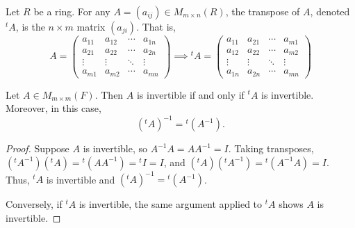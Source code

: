 \begin{definition}
  Let $R$ be a ring. For any $A = (a_{ij}) \in M_{m \times n}(R)$, the transpose of $A$, denoted ${}^t\!A$, is the $n \times m$ matrix $(a_{ji})$. That is,
  \[
    A =
    \begin{pmatrix}
      a_{11} & a_{12} & \cdots & a_{1n} \\
      a_{21} & a_{22} & \cdots & a_{2n} \\
      \vdots & \vdots & \ddots & \vdots \\
      a_{m1} & a_{m2} & \cdots & a_{mn}
    \end{pmatrix}
    \implies
    {}^t\!A =
    \begin{pmatrix}
      a_{11} & a_{21} & \cdots & a_{m1} \\
      a_{12} & a_{22} & \cdots & a_{m2} \\
      \vdots & \vdots & \ddots & \vdots \\
      a_{1n} & a_{2n} & \cdots & a_{mn}
    \end{pmatrix}
  \]
\end{definition}

\begin{proposition}
  Let $A \in M_{m \times m}(F)$. Then $A$ is invertible if and only if ${}^t\!A$ is invertible. Moreover, in this case,
  \[
    ({}^t\!A)^{-1} = {}^t\!(A^{-1}).
  \]
\end{proposition}

\begin{proof}
  Suppose $A$ is invertible, so $A^{-1}A = AA^{-1} = I$. Taking transposes, $({}^t\!A^{-1})({}^t\!A) = {}^t\!(A A^{-1}) = {}^t\!I = I$, and $({}^t\!A)({}^t\!A^{-1}) = {}^t\!(A^{-1}A) = I$. Thus, ${}^t\!A$ is invertible and $({}^t\!A)^{-1} = {}^t\!(A^{-1})$.

  Conversely, if ${}^t\!A$ is invertible, the same argument applied to ${}^t\!A$ shows $A$ is invertible.
\end{proof}
